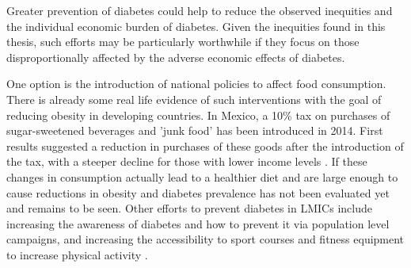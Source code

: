 Greater prevention of diabetes could help to reduce the observed inequities and the individual economic burden of diabetes. Given the inequities found in this thesis, such efforts may be particularly worthwhile if they focus on those disproportionally affected by the adverse economic effects of diabetes.

One option is the introduction of national policies to affect food consumption. There is already some real life evidence of such interventions with the goal of reducing obesity in developing countries. In Mexico, a 10\% tax on purchases of sugar-sweetened beverages and 'junk food' has been introduced in 2014. First results suggested a reduction in purchases of these goods after the introduction of the tax, with a steeper decline for those with lower income levels \parencite{Colchero2016,Batis2016}. If these changes in consumption actually lead to a healthier diet and are large enough to cause reductions in obesity and diabetes prevalence has not been evaluated yet and remains to be seen. Other efforts to prevent diabetes in \acp{LMIC} include increasing the awareness of diabetes and how to prevent it via population level campaigns, and  increasing the accessibility to sport courses and fitness equipment to increase physical activity \parencite{Cefalu2016}. 

